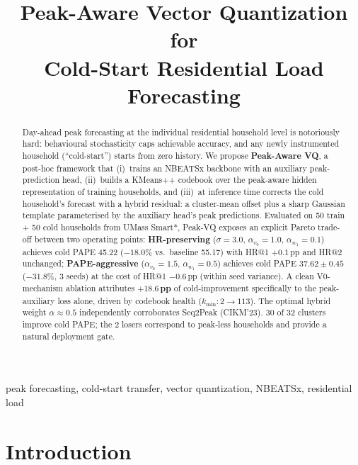 \documentclass[conference]{IEEEtran}
\begin{document}
\title{Peak-Aware Vector Quantization for\\ Cold-Start Residential Load Forecasting}

\author{
}

\maketitle

\begin{abstract}
Day-ahead peak forecasting at the individual residential household level is
notoriously hard: behavioural stochasticity caps achievable accuracy, and any
newly instrumented household (``cold-start'') starts from zero history. We
propose \textbf{Peak-Aware VQ}, a post-hoc framework that (i)~trains an
NBEATSx backbone with an auxiliary peak-prediction head, (ii)~builds a
KMeans++ codebook over the peak-aware hidden representation of training
households, and (iii)~at inference time corrects the cold household's
forecast with a hybrid residual: a cluster-mean offset plus a sharp Gaussian
template parameterised by the auxiliary head's peak predictions. Evaluated
on 50 train + 50 cold households from UMass Smart*, Peak-VQ exposes an
explicit Pareto trade-off between two operating points:
\textbf{HR-preserving} ($\sigma\!=\!3.0,\,\alpha_{v_0}\!=\!1.0,\,
\alpha_{w_1}\!=\!0.1$) achieves cold PAPE 45.22 ($-18.0\%$ vs.\ baseline
55.17) with HR@1 $+0.1$\,pp and HR@2 unchanged; \textbf{PAPE-aggressive}
($\alpha_{v_0}\!=\!1.5,\,\alpha_{w_1}\!=\!0.5$) achieves cold PAPE
$37.62\!\pm\!0.45$ ($-31.8\%$, 3 seeds) at the cost of HR@1 $-0.6$\,pp
(within seed variance). A clean V0-mechanism ablation attributes
\textbf{$+18.6$\,pp} of cold-improvement specifically to the
peak-auxiliary loss alone, driven by codebook health ($k_{\min}\!:\!2\!\to\!113$).
The optimal hybrid weight $\alpha\!\approx\!0.5$ independently corroborates
Seq2Peak (CIKM'23). 30 of 32 clusters improve cold PAPE; the 2 losers
correspond to peak-less households and provide a natural deployment gate.
\end{abstract}

\begin{IEEEkeywords}
peak forecasting, cold-start transfer, vector quantization, NBEATSx, residential load
\end{IEEEkeywords}

\section{Introduction}\label{sec:intro}
\end{document}

